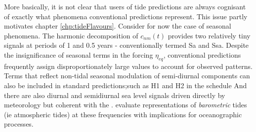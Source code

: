 More basically, it is not clear that users of tide predictions are always cognisant of exactly what phenomena conventional predictions represent.    This issue partly motivates chapter \ref{chp:tideFlavours}.
Consider for now the case of seasonal phenomena.   The harmonic decomposition of $c_{nm}(t)$ provides two relatively tiny signals at periods of 1 and 0.5 years - conventionally termed Sa and Ssa.  Despite the insignificance of seasonal terms in the forcing $\eta_{eq}$, conventional predictions frequently assign  disproportionately large values to account for observed patterns.  
Terms that reflect non-tidal seasonal modulation of semi-diurnal components can also be included in standard predictions;such as H1 and H2 in the \citet{Foreman:1977ua} schedule 
And there are also  diurnal and semidiurnal sea level signals driven directly by meteorology  but coherent with the \ATGP{}. \citet{Ray:2003ui} evaluate \NWP{} representations of \emph{barometric} tides (ie atmospheric tides) at these frequencies with implications for oceanographic processes.  


